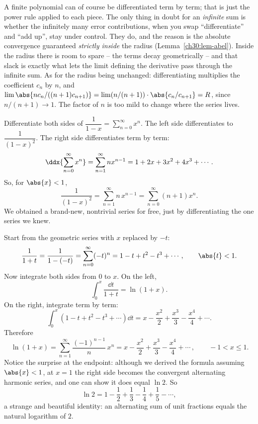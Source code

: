 \begin{whybox}
A finite polynomial can of course be differentiated term by term; that is just the power rule applied to each piece. The only thing in doubt for an \emph{infinite} sum is whether the infinitely many error contributions, when you swap ``differentiate'' and ``add up'', stay under control. They do, and the reason is the absolute convergence guaranteed \emph{strictly inside} the radius (Lemma~\ref{ch30:lem-abel}). Inside the radius there is room to spare -- the terms decay geometrically -- and that slack is exactly what lets the limit defining the derivative pass through the infinite sum. As for the radius being unchanged: differentiating multiplies the coefficient $c_n$ by $n$, and $\lim \abs{n c_n / ((n+1)c_{n+1})} = \lim (n/(n+1))\cdot\abs{c_n/c_{n+1}} = R$, since $n/(n+1)\to 1$. The factor of $n$ is too mild to change where the series lives.
\end{whybox}

\begin{example}
\label{ch30:ex-deriv-geom}
Differentiate both sides of $\dfrac{1}{1-x} = \sum_{n=0}^{\infty} x^n$. The left side differentiates to $\dfrac{1}{(1-x)^2}$. The right side differentiates term by term:
\[
  \ddx{\sum_{n=0}^{\infty} x^n} = \sum_{n=1}^{\infty} n x^{n-1} = 1 + 2x + 3x^2 + 4x^3 + \cdots.
\]
So, for $\abs{x}<1$,
\[
  \frac{1}{(1-x)^2} = \sum_{n=1}^{\infty} n\,x^{n-1} = \sum_{n=0}^{\infty}(n+1)x^n.
\]
We obtained a brand-new, nontrivial series for free, just by differentiating the one series we knew.
\end{example}

\begin{example}
\label{ch30:ex-ln-series}
Start from the geometric series with $x$ replaced by $-t$:
\[
  \frac{1}{1+t} = \frac{1}{1-(-t)} = \sum_{n=0}^{\infty}(-t)^n = 1 - t + t^2 - t^3 + \cdots, \qquad \abs{t}<1.
\]
Now integrate both sides from $0$ to $x$. On the left,
\[
  \int_0^x \frac{\dd t}{1+t} = \ln(1+x).
\]
On the right, integrate term by term:
\[
  \int_0^x \left(1 - t + t^2 - t^3 + \cdots\right)\dd t
  = x - \frac{x^2}{2} + \frac{x^3}{3} - \frac{x^4}{4} + \cdots.
\]
Therefore
\[
  \boxed{\,\ln(1+x) = \sum_{n=1}^{\infty} \frac{(-1)^{n-1}}{n}\,x^n
  = x - \frac{x^2}{2} + \frac{x^3}{3} - \frac{x^4}{4} + \cdots\,}, \qquad -1 < x \le 1.
\]
Notice the surprise at the endpoint: although we derived the formula assuming $\abs{x}<1$, at $x=1$ the right side becomes the convergent alternating harmonic series, and one can show it does equal $\ln 2$. So
\[
  \ln 2 = 1 - \frac12 + \frac13 - \frac14 + \frac15 - \cdots,
\]
a strange and beautiful identity: an alternating sum of unit fractions equals the natural logarithm of $2$.
\end{example}

